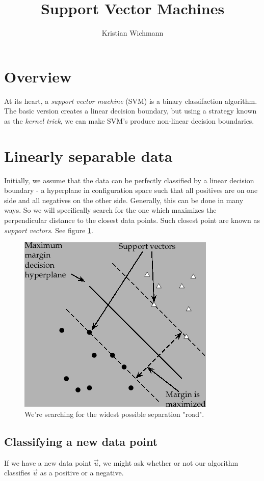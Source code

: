 \documentclass[12pt, a4paper]{article}
\title{Support Vector Machines}
\author{Kristian Wichmann}
\numberwithin{equation}{section}
\begin{document}
\maketitle

\section{Overview}
At its heart, a \textit{support vector machine} (SVM) is a binary classifaction algorithm. The basic version creates a linear decision boundary, but using a strategy known as the \textit{kernel trick}, we can make SVM's produce non-linear decision boundaries.

\section{Linearly separable data}
Initially, we assume that the data can be perfectly classified by a linear decision boundary - a hyperplane in configuration space such that all positives are on one side and all negatives on the other side. Generally, this can be done in many ways. So we will specifically search for the one which maximizes the perpendicular distance to the closest data points. Such closest point are known as \textit{support vectors}. See figure \ref{fig:svm_linear}.

\begin{figure}
\centering
\includegraphics[scale=0.5]{svm1}
\caption{We're searching for the widest possible separation "road".}
\label{fig:svm_linear}
\end{figure}

\subsection{Classifying a new data point}
If we have a new data point $\vec{u}$, we might ask whether or not our algorithm classifies $\vec{u}$ as a positive or a negative.
\end{document}
